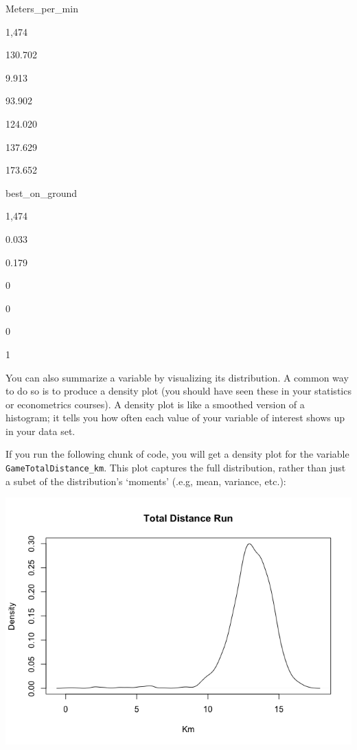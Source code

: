\documentclass[
]{article}
\newenvironment{Shaded}{\begin{snugshade}}{\end{snugshade}}
\newcommand{\AttributeTok}[1]{\textcolor[rgb]{0.77,0.63,0.00}{#1}}
\newcommand{\FunctionTok}[1]{\textcolor[rgb]{0.00,0.00,0.00}{#1}}
\newcommand{\NormalTok}[1]{#1}
\newcommand{\SpecialCharTok}[1]{\textcolor[rgb]{0.00,0.00,0.00}{#1}}
\newcommand{\StringTok}[1]{\textcolor[rgb]{0.31,0.60,0.02}{#1}}
\begin{document}
Meters\_per\_min

1,474

130.702

9.913

93.902

124.020

137.629

173.652

best\_on\_ground

1,474

0.033

0.179

0

0

0

1

You can also summarize a variable by visualizing its distribution. A
common way to do so is to produce a density plot (you should have seen
these in your statistics or econometrics courses). A density plot is
like a smoothed version of a histogram; it tells you how often each
value of your variable of interest shows up in your data set.

If you run the following chunk of code, you will get a density plot for
the variable \texttt{GameTotalDistance\_km}. This plot captures the full
distribution, rather than just a subet of the distribution's `moments'
(.e.g, mean, variance, etc.):

\begin{Shaded}
\end{Shaded}

\includegraphics{Preparation_files/figure-gfm/unnamed-chunk-15-1.png}
\end{document}
